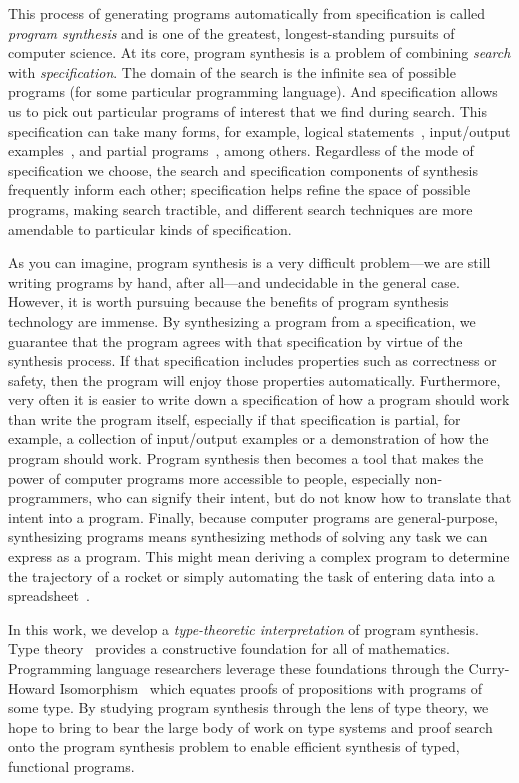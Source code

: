 This process of generating programs automatically from specification is called \emph{program synthesis} and is one of the greatest, longest-standing pursuits of computer science.
At its core, program synthesis is a problem of combining \emph{search} with \emph{specification}.
The domain of the search is the infinite sea of possible programs (for some particular programming language).
And specification allows us to pick out particular programs of interest that we find during search.
This specification can take many forms, for example, logical statements~\citep{green-ijcai-1969, manna-tse-1979}, input/output examples~\citep{summers-popl-1976, kitzelmann-thesis-2010, albarghouthi-cav-2013, feser-pldi-2015}, and partial programs~\citep{solar-lezama-thesis-2008, alur-fmcad-2013, singh-pldi-2013}, among others.
Regardless of the mode of specification we choose, the search and specification components of synthesis frequently inform each other; specification helps refine the space of possible programs, making search tractible, and different search techniques are more amendable to particular kinds of specification.

As you can imagine, program synthesis is a very difficult problem---we are still writing programs by hand, after all---and undecidable in the general case.
However, it is worth pursuing because the benefits of program synthesis technology are immense.
By synthesizing a program from a specification, we guarantee that the program agrees with that specification by virtue of the synthesis process.
If that specification includes properties such as correctness or safety, then the program will enjoy those properties automatically.
Furthermore, very often it is easier to write down a specification of how a program should work than write the program itself, especially if that specification is partial, for example, a collection of input/output examples or a demonstration of how the program should work.
Program synthesis then becomes a tool that makes the power of computer programs more accessible to people, especially non-programmers, who can signify their intent, but do not know how to translate that intent into a program.
Finally, because computer programs are general-purpose, synthesizing programs means synthesizing methods of solving any task we can express as a program.
This might mean deriving a complex program to determine the trajectory of a rocket or simply automating the task of entering data into a spreadsheet~\citep{gulwani-popl-2011}.

In this work, we develop a \emph{type-theoretic interpretation} of program synthesis.
Type theory~\citep{martin-lof-1984} provides a constructive foundation for all of mathematics.
Programming language researchers leverage these foundations through the Curry-Howard Isomorphism~\citep{william-curry-1980} which equates proofs of propositions with programs of some type.
By studying program synthesis through the lens of type theory, we hope to bring to bear the large body of work on type systems and proof search onto the program synthesis problem to enable efficient synthesis of typed, functional programs.

